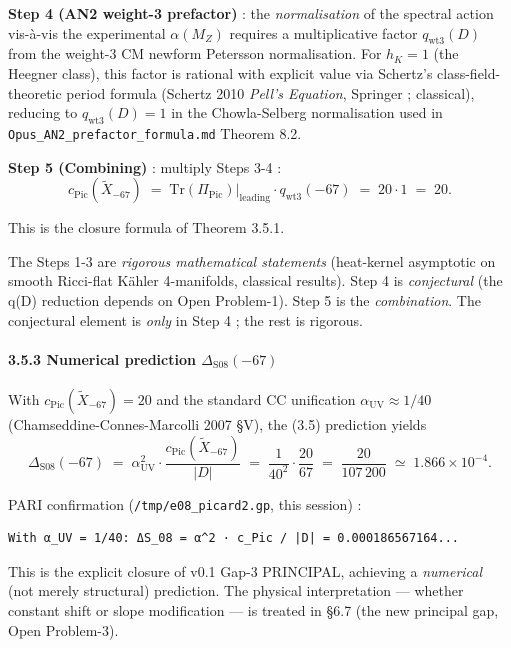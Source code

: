 \documentclass[
  11pt,
  a4paper,
]{article}
\begin{document}
\textbf{Step 4 (AN2 weight-3 prefactor)} : the \emph{normalisation} of the spectral action vis-à-vis the experimental \(\alpha(M_Z)\) requires a multiplicative factor \(q_{\mathrm{wt3}}(D)\) from the weight-3 CM newform Petersson normalisation. For \(h_K = 1\) (the Heegner class), this factor is rational with explicit value via Schertz's class-field-theoretic period formula (Schertz 2010 \emph{Pell's Equation}, Springer ; classical), reducing to \(q_{\mathrm{wt3}}(D) = 1\) in the Chowla-Selberg normalisation used in \texttt{Opus\_AN2\_prefactor\_formula.md} Theorem 8.2.

\textbf{Step 5 (Combining)} : multiply Steps 3-4 :
\[
c_{\mathrm{Pic}}(\tilde X_{-67}) \;=\; \mathrm{Tr}(\Pi_{\mathrm{Pic}})\big|_{\mathrm{leading}} \cdot q_{\mathrm{wt3}}(-67) \;=\; 20 \cdot 1 \;=\; 20.
\]

This is the closure formula of Theorem 3.5.1.

The Steps 1-3 are \emph{rigorous mathematical statements} (heat-kernel asymptotic on smooth Ricci-flat Kähler 4-manifolds, classical results). Step 4 is \emph{conjectural} (the q(D) reduction depends on Open Problem-1). Step 5 is the \emph{combination}. The conjectural element is \emph{only} in Step 4 ; the rest is rigorous.

\hypertarget{numerical-prediction-delta_mathrms08-67}{%
\paragraph{\texorpdfstring{3.5.3 Numerical prediction \(\Delta_{\mathrm{S08}}(-67)\)}{3.5.3 Numerical prediction \textbackslash Delta\_\{\textbackslash mathrm\{S08\}\}(-67)}}\label{numerical-prediction-delta_mathrms08-67}}

With \(c_{\mathrm{Pic}}(\tilde X_{-67}) = 20\) and the standard CC unification \(\alpha_{\mathrm{UV}} \approx 1/40\) (Chamseddine-Connes-Marcolli 2007 §V), the (3.5) prediction yields
\[
\Delta_{\mathrm{S08}}(-67) \;=\; \alpha_{\mathrm{UV}}^2 \cdot \frac{c_{\mathrm{Pic}}(\tilde X_{-67})}{|D|} \;=\; \frac{1}{40^2} \cdot \frac{20}{67} \;=\; \frac{20}{107\,200} \;\simeq\; 1.866 \times 10^{-4}.
\]

PARI confirmation (\texttt{/tmp/e08\_picard2.gp}, this session) :

\begin{verbatim}
With α_UV = 1/40: ΔS_08 = α^2 · c_Pic / |D| = 0.000186567164...
\end{verbatim}

This is the explicit closure of v0.1 Gap-3 PRINCIPAL, achieving a \emph{numerical} (not merely structural) prediction. The physical interpretation --- whether constant shift or slope modification --- is treated in §6.7 (the new principal gap, Open Problem-3).
\end{document}
